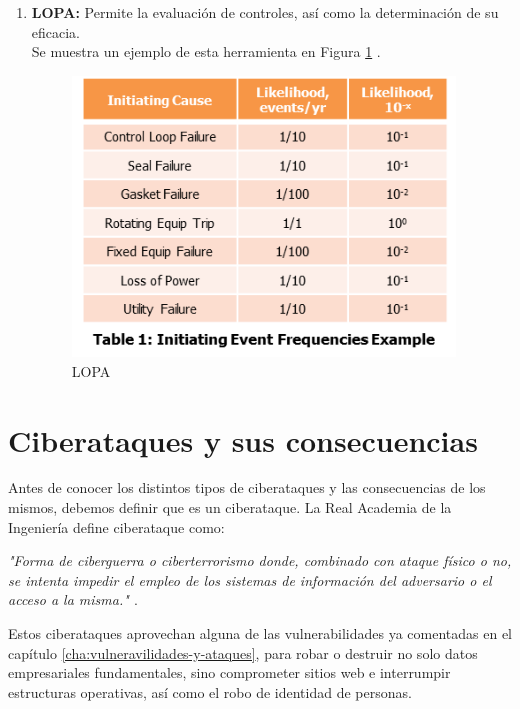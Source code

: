 \begin{enumerate}
\item {\bfseries LOPA:}
Permite la evaluación de controles, así como la determinación de su eficacia.\\
Se muestra un ejemplo de esta herramienta en Figura \ref{img:lopa} \cite{lopa}.
\begin{figure}[tphb]
  		   \centering
     		   \includegraphics[width=4in]{LOPA.png}
  		   \caption{LOPA}
  		   \label{img:lopa}
\end{figure}

\end{enumerate}




\chapter{Ciberataques y sus consecuencias}
\label{cha:ciberataques-y-consecuencias}

Antes de conocer los distintos tipos de ciberataques y las consecuencias de los mismos, debemos definir que es un ciberataque. La Real Academia 
de la Ingeniería define ciberataque como:

\emph{"Forma de ciberguerra o ciberterrorismo donde, combinado con ataque físico o no, se intenta impedir el empleo de los sistemas de información 
del adversario o el acceso a la misma." \cite{ciberataque-rai}}.

Estos ciberataques aprovechan alguna de las vulnerabilidades ya comentadas en el capítulo \ref{cha:vulneravilidades-y-ataques}, para robar o destruir
no solo datos empresariales fundamentales, sino comprometer sitios web e interrumpir estructuras operativas, así como el robo de identidad de personas.

